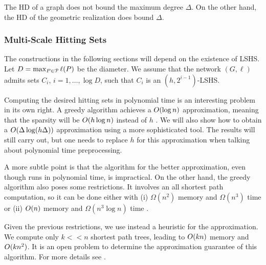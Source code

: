 The HD of a graph does not bound the maximum degree $\Delta$.
On the other hand, the HD of the geometric realization does bound $\Delta$.


\subsubsection{Multi-Scale Hitting Sets} \label{sec:multi_scale}
The constructions in the following sections will depend on the existence of LSHS.
Let $D=\max_{P\in\mathcal{P}}\ell(P)$ be the diameter.
We assume that the network $(G,\ell)$ admits sets $C_i$, $i=1,\ldots,\log D$, such that $C_i$ is an $(h,2^{i-1})$-LSHS.

Computing the desired hitting sets in polynomial time is an interesting problem in its own right.
A greedy algorithm achieves a $O(\log n)$ approximation, meaning that the sparsity will be $O(h\log n)$ instead of $h$ .
We will also show how to obtain a $O(\Delta\log(h\Delta))$ approximation using a more sophisticated tool.
The results will still carry out, but one needs to replace $h$ for this approximation when talking about polynomial time preprocessing.

A more subtle point is that the algorithm for the better approximation, even though runs in polynomial time, is impractical.
On the other hand, the greedy algorithm also poses some restrictions.
It involves an all shortest path computation, so it can be done either with (i) $\Omega(n^2)$ memory and $\Omega(n^3)$ time or (ii) $O(n)$ memory and $\Omega(n^3\log n)$ time . 

Given the previous restrictions, we use instead a heuristic for the approximation.
We compute only $k<<n$ shortest path trees, leading to $O(kn)$ memory and $O(kn^2)$.
It is an open problem to determine the approximation guarantee of this algorithm.
For more details see .

